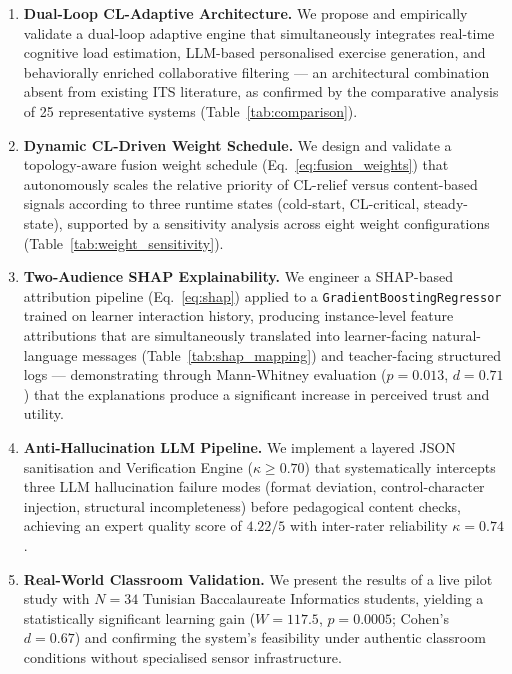 \documentclass[ASNA,twocolumn]{USG} %
\begin{document}
\begin{enumerate}[1.]

  \item \textbf{Dual-Loop CL-Adaptive Architecture.}
        We propose and empirically validate a dual-loop
        adaptive engine that simultaneously integrates
        real-time cognitive load estimation, LLM-based
        personalised exercise generation, and
        behaviorally enriched collaborative filtering ---
        an architectural combination absent from existing
        ITS literature, as confirmed by the comparative
        analysis of 25 representative systems
        (Table~\ref{tab:comparison}).

  \item \textbf{Dynamic CL-Driven Weight Schedule.}
        We design and validate a topology-aware fusion weight
        schedule (Eq.~\eqref{eq:fusion_weights}) that
        autonomously scales the relative priority of
        CL-relief versus content-based signals according to
        three runtime states (cold-start, CL-critical,
        steady-state), supported by a sensitivity analysis
        across eight weight configurations
        (Table~\ref{tab:weight_sensitivity}).

  \item \textbf{Two-Audience SHAP Explainability.}
        We engineer a SHAP-based attribution pipeline
        (Eq.~\eqref{eq:shap}) applied to a
        \texttt{GradientBoostingRegressor} trained on
        learner interaction history, producing
        instance-level feature attributions that are
        simultaneously translated into learner-facing
        natural-language messages
        (Table~\ref{tab:shap_mapping}) and
        teacher-facing structured logs --- demonstrating
        through Mann-Whitney evaluation ($p{=}0.013$,
        $d{=}0.71$) that the explanations produce a
        significant increase in perceived trust and utility.

  \item \textbf{Anti-Hallucination LLM Pipeline.}
        We implement a layered JSON sanitisation and
        Verification Engine ($\kappa \geq 0.70$) that
        systematically intercepts three LLM hallucination
        failure modes (format deviation, control-character
        injection, structural incompleteness) before
        pedagogical content checks, achieving an expert
        quality score of $4.22/5$ with inter-rater
        reliability $\kappa{=}0.74$.

  \item \textbf{Real-World Classroom Validation.}
        We present the results of a live pilot study with
        $N{=}34$ Tunisian Baccalaureate Informatics
        students, yielding a statistically significant
        learning gain ($W{=}117.5$, $p{=}0.0005$;
        Cohen's $d{=}0.67$) and confirming the system's
        feasibility under authentic classroom conditions
        without specialised sensor infrastructure.


\end{enumerate}
\end{document}
